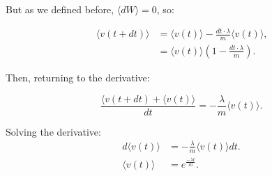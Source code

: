 But as we defined before, $\langle dW \rangle = 0$, so:

\begin{align}
  \langle v(t + dt) \rangle &= \langle v(t) \rangle - \frac{dt \cdot \lambda}{m} \langle v(t) \rangle \text{,}\\
                            &= \langle v(t) \rangle( 1 - \frac{dt \cdot \lambda}{m} ) \text{.}
\end{align}

Then, returning to the derivative:

\begin{equation}
  \frac{\langle v(t + dt) + \langle v(t) \rangle}{dt} = - \frac{\lambda}{m} \langle v(t) \rangle \text{.}
  \label{eq:derivative}
\end{equation}

Solving the derivative:
\begin{align}
  d\langle v(t) \rangle &= - \frac{\lambda}{m}\langle v(t) \rangle dt \text{.}\\
  \langle v(t) \rangle &= e^{\frac{-\lambda t}{m}} \text{.}
\end{align}



